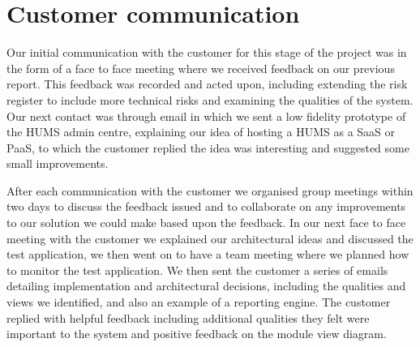 \section{Customer communication}
\label{sec:communication}

Our initial communication with the customer for this stage of the project was in the form of a face to face meeting where we received feedback on our previous report. This feedback was recorded and acted upon, including extending the risk register to include more technical risks and examining the qualities of the system. Our next contact was through email in which we sent a low fidelity prototype of the HUMS admin centre, explaining our idea of hosting a HUMS as a SaaS or PaaS, to which the customer replied the idea was interesting and suggested some small improvements. 

After each communication with the customer we organised group meetings within two days to discuss the feedback issued and to collaborate on any improvements to our solution we could make based upon the feedback. In our next face to face meeting with the customer we explained our architectural ideas and discussed the test application, we then went on to have a team meeting where we planned how to monitor the test application. We then sent the customer a series of emails detailing implementation and architectural decisions, including the qualities and views we identified, and also an example of a reporting engine. The customer replied with helpful feedback including additional qualities they felt were important to the system and positive feedback on the module view diagram.
